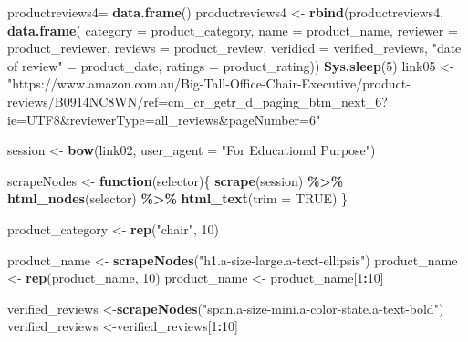 \documentclass[
]{article}
\newenvironment{Shaded}{\begin{snugshade}}{\end{snugshade}}
\newcommand{\AttributeTok}[1]{\textcolor[rgb]{0.13,0.29,0.53}{#1}}
\newcommand{\ConstantTok}[1]{\textcolor[rgb]{0.56,0.35,0.01}{#1}}
\newcommand{\ControlFlowTok}[1]{\textcolor[rgb]{0.13,0.29,0.53}{\textbf{#1}}}
\newcommand{\DecValTok}[1]{\textcolor[rgb]{0.00,0.00,0.81}{#1}}
\newcommand{\FunctionTok}[1]{\textcolor[rgb]{0.13,0.29,0.53}{\textbf{#1}}}
\newcommand{\NormalTok}[1]{#1}
\newcommand{\OtherTok}[1]{\textcolor[rgb]{0.56,0.35,0.01}{#1}}
\newcommand{\SpecialCharTok}[1]{\textcolor[rgb]{0.81,0.36,0.00}{\textbf{#1}}}
\newcommand{\StringTok}[1]{\textcolor[rgb]{0.31,0.60,0.02}{#1}}
\begin{document}
\begin{Shaded}
\begin{Highlighting}[]
\NormalTok{  productreviews4}\OtherTok{=} \FunctionTok{data.frame}\NormalTok{()}
\NormalTok{  productreviews4 }\OtherTok{\textless{}{-}} \FunctionTok{rbind}\NormalTok{(productreviews4, }\FunctionTok{data.frame}\NormalTok{(}
                      \AttributeTok{category =}\NormalTok{ product\_category,}
                      \AttributeTok{name =}\NormalTok{ product\_name,}
                      \AttributeTok{reviewer =}\NormalTok{ product\_reviewer,}
                      \AttributeTok{reviews =}\NormalTok{ product\_review,}
                      \AttributeTok{veridied =}\NormalTok{ verified\_reviews,}
                      \StringTok{"date of review"} \OtherTok{=}\NormalTok{ product\_date,}
                      \AttributeTok{ratings =}\NormalTok{ product\_rating))}
   \FunctionTok{Sys.sleep}\NormalTok{(}\DecValTok{5}\NormalTok{)}
\NormalTok{link05 }\OtherTok{\textless{}{-}} \StringTok{"https://www.amazon.com.au/Big{-}Tall{-}Office{-}Chair{-}Executive/product{-}reviews/B0914NC8WN/ref=cm\_cr\_getr\_d\_paging\_btm\_next\_6?ie=UTF8\&reviewerType=all\_reviews\&pageNumber=6"}


\NormalTok{  session }\OtherTok{\textless{}{-}} \FunctionTok{bow}\NormalTok{(link02,}
               \AttributeTok{user\_agent =} \StringTok{"For Educational Purpose"}\NormalTok{)}

\NormalTok{  scrapeNodes }\OtherTok{\textless{}{-}} \ControlFlowTok{function}\NormalTok{(selector)\{}
    \FunctionTok{scrape}\NormalTok{(session) }\SpecialCharTok{\%\textgreater{}\%}
      \FunctionTok{html\_nodes}\NormalTok{(selector) }\SpecialCharTok{\%\textgreater{}\%}
      \FunctionTok{html\_text}\NormalTok{(}\AttributeTok{trim =} \ConstantTok{TRUE}\NormalTok{)}
\NormalTok{  \}}

\NormalTok{  product\_category }\OtherTok{\textless{}{-}} \FunctionTok{rep}\NormalTok{(}\StringTok{"chair"}\NormalTok{, }\DecValTok{10}\NormalTok{)}

\NormalTok{  product\_name }\OtherTok{\textless{}{-}} \FunctionTok{scrapeNodes}\NormalTok{(}\StringTok{"h1.a{-}size{-}large.a{-}text{-}ellipsis"}\NormalTok{)}
\NormalTok{  product\_name }\OtherTok{\textless{}{-}} \FunctionTok{rep}\NormalTok{(product\_name, }\DecValTok{10}\NormalTok{)}
\NormalTok{  product\_name }\OtherTok{\textless{}{-}}\NormalTok{ product\_name[}\DecValTok{1}\SpecialCharTok{:}\DecValTok{10}\NormalTok{]}
  
\NormalTok{  verified\_reviews }\OtherTok{\textless{}{-}}\FunctionTok{scrapeNodes}\NormalTok{(}\StringTok{"span.a{-}size{-}mini.a{-}color{-}state.a{-}text{-}bold"}\NormalTok{)}
\NormalTok{  verified\_reviews }\OtherTok{\textless{}{-}}\NormalTok{verified\_reviews[}\DecValTok{1}\SpecialCharTok{:}\DecValTok{10}\NormalTok{]}
  

\end{Highlighting}
\end{Shaded}
\end{document}
